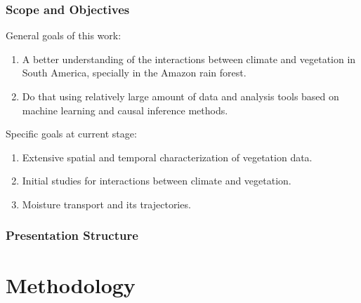 \documentclass[11pt]{beamer}
\begin{document}
\begin{frame}
  \frametitle{\normalsize{\textbf{
        Scope and Objectives
  }}}

  \scriptsize{
    
    \textbullet \: General goals of this work:

    \begin{enumerate}
      
    \item A better understanding of the interactions between climate and
      vegetation in South America, specially in the Amazon rain forest. 
      
    \item Do that using relatively large amount of data and analysis tools based
      on machine learning and causal inference methods.
      
    \end{enumerate}
      
    \textbullet \: Specific goals at current stage:

    \begin{enumerate}

    \item Extensive spatial and temporal characterization of vegetation data.

    \item Initial studies for interactions between climate and vegetation.
      
    \item Moisture transport and its trajectories.
      
    \end{enumerate}
    
  }
  
\end{frame}

\begin{frame}
  \frametitle{\normalsize{\textbf{
        Presentation Structure
  }}}

  \section{Methodology}
  \tableofcontents[currentsection] 
  
\end{frame}
\end{document}
